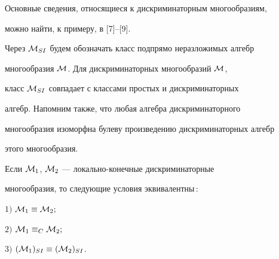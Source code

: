 Основные сведения, относящиеся к дискриминаторным многообразиям,


можно найти, к примеру, в [7]--[9].


Через ${\cal M}_{SI}$ будем обозначать класс подпрямо неразложимых алгебр


многообразия ${\cal M}$. Для дискриминаторных многообразий ${\cal M}$,


класс ${\cal M}_{SI}$ совпадает с классами простых и дискриминаторных


алгебр. Напомним также, что любая алгебра дискриминаторного


многообразия изоморфна булеву произведению дискриминаторных алгебр


этого многообразия.





\begin{thm} Если ${\cal M}_1$, ${\cal M}_2$ --- локально-конечные дискриминаторные


многообразия, то следующие условия эквивалентны\,$:$





$1)$ ${\cal M}_1\equiv{\cal M}_2;$


$2)$ ${\cal M}_1\equiv_C{\cal M}_2;$


$3)$ $({\cal M}_1)_{SI}\equiv ({\cal M}_2)_{SI}$.


\end{thm}





